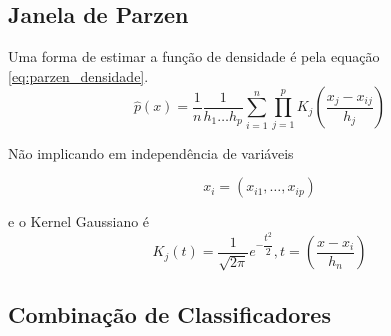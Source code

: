\subsection{Janela de Parzen}
\label{subsec:exp-janeladeparzen}


Uma forma de estimar a função de densidade é pela equação \ref{eq:parzen_densidade}.
\begin{equation}
\label{eq:parzen_densidade}
\hat{p}(x) = \dfrac{1}{n} \dfrac{1}{h_1 \ldots h_p} \sum_{i = 1}^{n}\prod_{j = 1}^{p} K_j \left (\dfrac{x_j - x_{ij}}{h_j} \right )
\end{equation}

Não implicando em independência de variáveis

\begin{equation}
\label{eq:parzen_independencia}
x_i = \left (x_{i1}, \ldots, x_{ip} \right)
\end{equation}

e o Kernel Gaussiano é
\begin{equation}
\label{eq:kernel}
K_j(t) = \dfrac{1}{\sqrt{2\pi}} e^{- \dfrac{t^2}{2}}, t = \left (\dfrac{x - x_i}{h_n} \right)
\end{equation}

\subsection{Combinação de Classificadores}
\label{subsec:exp-combinacaodeclassificadores}








